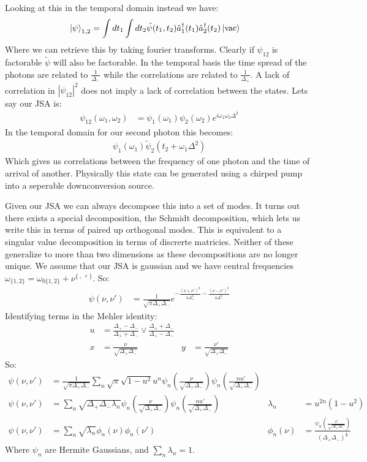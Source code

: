 Looking at this in the temporal domain instead we have:
\begin{align*}
	\ket{\psi}_{1,2} &= \int dt_1\int dt_2 \tilde{\psi}(t_1,t_2) \hat{a}_1^\dagger(t_1)\hat{a}_2^\dagger(t_2)\ket{\text{vac}}
\end{align*}
Where we can retrieve this by taking fourier transforms. Clearly if $\psi_{12}$ is factorable $\tilde{\psi}$ will also be factorable. 
In the temporal basis the time spread of the photons are related to $\frac{1}{\Delta_-}$ while the correlations are related to $\frac{1}{\Delta_+}$.
A lack of correlation in $|\psi_{12}|^2$ does not imply a lack of correlation between the states. 
Lets say our JSA is:
\begin{align*}
	\psi_{12}(\omega_1,\omega_2) &= \psi_1(\omega_1)\psi_2(\omega_2) e^{i\omega_1\omega_2 \Delta^2}
\end{align*}
In the temporal domain for our second photon this becomes:
\begin{align*}
	\psi_1(\omega_1)\tilde{\psi}_2(t_2 + \omega_1\Delta^2)
\end{align*}
Which gives us correlations between the frequency of one photon and the time of arrival of another. Physically this state can be generated using a chirped pump into a seperable downconversion source.

Given our JSA we can always decompose this into a set of modes. It turns out there exists a special decomposition, the Schmidt decomposition, which lets us write this in terms of paired up orthogonal modes.
This is equivalent to a singular value decomposition in terms of discrerte matricies. Neither of these generalize to more than two dimensions as these decompositions are no longer unique.
We assume that our JSA is gaussian and we have central frequencies $\omega_{\{1,2\}} = \omega_{0\{1,2\}} + \nu^{\{\ ,}\ '\ ^\}$. So:
\begin{align*}
	\psi(\nu,\nu') &= \frac{1}{\sqrt{\pi\Delta_+\Delta_-}} e^{- \frac{(\nu + \nu')^2}{4\Delta_+^2} - \frac{(\nu-\nu')^2}{4\Delta_-^2}}
\end{align*}
Identifying terms in the Mehler identity:
\begin{align*}
	u &= \frac{\Delta_+ - \Delta_-}{\Delta_+ +\Delta_-} \lor \frac{\Delta_+ +\Delta_-}{\Delta_+ - \Delta_-} \\
	x &= \frac{\nu}{\sqrt{\Delta_+\Delta_-}} & y &= \frac{\nu'}{\sqrt{\Delta_+\Delta_-}} 
\end{align*}
So:
\begin{align*}
	\psi(\nu,\nu') &= \frac{1}{\sqrt{\pi\Delta_+\Delta_-}} \sum_n \sqrt{\pi}\sqrt{1-u^2} u^n \psi_n\left(\frac{\nu}{\sqrt{\Delta_+\Delta_-}}\right)\psi_n\left(\frac{nu'}{\sqrt{\Delta_+\Delta_-}}\right) \\
	\psi(\nu,\nu') &= \sum_n \sqrt{\Delta_+\Delta_-\lambda_n} \psi_n\left(\frac{\nu}{\sqrt{\Delta_+\Delta_-}}\right)\psi_n\left(\frac{nu'}{\sqrt{\Delta_+\Delta_-}}\right) & \lambda_n &= u^{2n}(1-u^2) \\
	\psi(\nu,\nu') &= \sum_n \sqrt{\lambda_n}\phi_n(\nu)\phi_n(\nu') & \phi_n(\nu) &= \frac{\psi_n\left(\frac{\nu}{\sqrt{\Delta_+\Delta_-}}\right)}{(\Delta_+\Delta_-)^\frac{1}{4}}
\end{align*}
Where $\psi_n$ are Hermite Gaussians, and $\sum_n \lambda_n = 1$.


